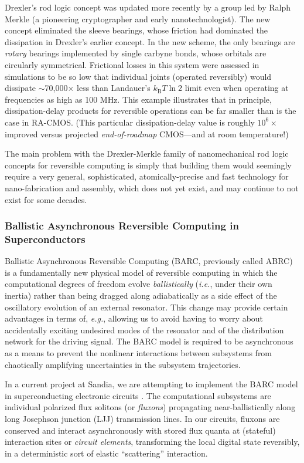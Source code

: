 \documentclass[preprints,article,accept,moreauthors,pdftex]{Definitions/mdpi}
\begin{document}
\begin{paracol}{2}
Drexler's rod logic concept was updated more recently \cite{Merkle+16,Merkle+18} by a group led by Ralph Merkle (a pioneering cryptographer and early nanotechnologist). The new concept eliminated the sleeve bearings, whose friction had dominated the dissipation in Drexler's earlier concept. In the new scheme, the only bearings are \emph{rotary} bearings implemented by single carbyne bonds, whose orbitals are circularly symmetrical. Frictional losses in this system were assessed in simulations \cite{HMA17} to be so low that individual joints (operated reversibly) would dissipate $\sim$70,000$\times$ less than Landauer's $k_{\mathrm{B}}T\ln 2$ limit even when operating at frequencies as high as 100 MHz. This example illustrates that in principle, dissipation-delay products for reversible operations can be far smaller than is the case in RA-CMOS. (This particular dissipation-delay value is roughly $10^6\times$ improved versus projected \emph{end-of-roadmap} CMOS---and at room temperature!)

The main problem with the Drexler-Merkle family of nanomechanical rod logic concepts for reversible computing is simply that building them would seemingly require a very general, sophisticated, atomically-precise and fast technology for nano-fabrication and assembly, which does not yet exist, and may continue to not exist for some decades.

\subsubsection{Ballistic Asynchronous Reversible Computing in Superconductors}
\label{sssec:barcs}

Ballistic Asynchronous Reversible Computing (BARC, previously called ABRC) \cite{Fra17b} is a fundamentally new physical model of reversible computing in which the computational degrees of freedom evolve \emph{ballistically} (\emph{i.e.}, under their own inertia) rather than being dragged along adiabatically as a side effect of the oscillatory evolution of an external resonator. This change may provide certain advantages in terms of, \emph{e.g.}, allowing us to avoid having to worry about accidentally exciting undesired modes of the resonator and of the distribution network for the driving signal. The BARC model is required to be asynchronous as a means to prevent the nonlinear interactions between subsystems from chaotically amplifying uncertainties in the subsystem trajectories.

In a current project at Sandia, we are attempting to implement the BARC model in superconducting electronic circuits \cite{Fra+19a}. The computational subsystems are individual polarized flux solitons (or \emph{fluxons}) propagating near-ballistically along long Josephson junction (LJJ) transmission lines. In our circuits, fluxons are conserved and interact asynchronously with stored flux quanta at (stateful) interaction sites or \emph{circuit elements}, transforming the local digital state reversibly, in a deterministic sort of elastic ``scattering'' interaction.


\end{paracol}
\end{document}
